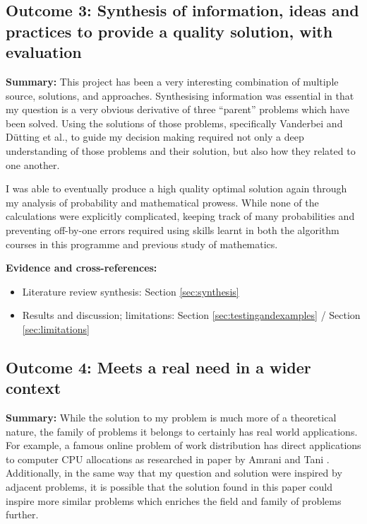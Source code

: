 \documentclass[a4paper,11pt]{article}
\begin{document}
\subsection*{Outcome 3: Synthesis of information, ideas and practices to provide a quality solution, with evaluation}

\textbf{Summary:} This project has been a very interesting combination of multiple source, solutions, and approaches. Synthesising information was essential in that my question is a very obvious derivative of three ``parent'' problems which have been solved. Using the solutions of those problems, specifically Vanderbei \cite{vanderbei2011postdoc} and D\"utting et al.,\cite{dütting2020secretariesadvice} to guide my decision making required not only a deep understanding of those problems and their solution, but also how they related to one another. 

I was able to eventually produce a high quality optimal solution again through my analysis of probability and mathematical prowess. While none of the calculations were explicitly complicated, keeping track of many probabilities and preventing off-by-one errors required using skills learnt in both the algorithm courses in this programme and previous study of mathematics.

\textbf{Evidence and cross-references:}
\begin{itemize}
\item Literature review synthesis: Section \ref{sec:synthesis}
\item Results and discussion; limitations: Section \ref{sec:testingandexamples} / Section \ref{sec:limitations}
\end{itemize}

\subsection*{Outcome 4: Meets a real need in a wider context}

\textbf{Summary:} While the solution to my problem is much more of a theoretical nature, the family of problems it belongs to certainly has real world applications. For example, a famous online problem of work distribution has direct applications to computer CPU allocations as researched in paper by Amrani and Tani \cite{CPUallocation}. Additionally, in the same way that my question and solution were inspired by adjacent problems, it is possible that the solution found in this paper could inspire more similar problems which enriches the field and family of problems further.
\end{document}
